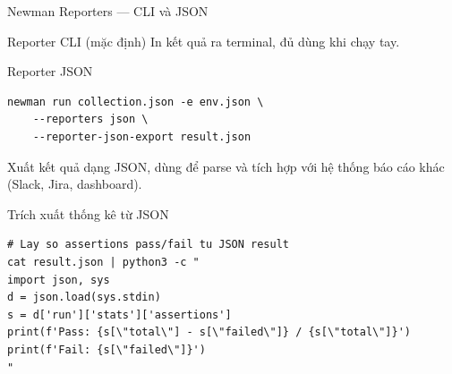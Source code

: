 \documentclass[aspectratio=169,10pt]{beamer}
\begin{document}
\begin{frame}[fragile]{Newman Reporters --- CLI và JSON}
  \begin{block}{Reporter CLI (mặc định)}
    In kết quả ra terminal, đủ dùng khi chạy tay.
  \end{block}

  \begin{block}{Reporter JSON}
\begin{lstlisting}[style=bash]
newman run collection.json -e env.json \
    --reporters json \
    --reporter-json-export result.json
\end{lstlisting}
    Xuất kết quả dạng JSON, dùng để parse và tích hợp
    với hệ thống báo cáo khác (Slack, Jira, dashboard).
  \end{block}

  \begin{block}{Trích xuất thống kê từ JSON}
\begin{lstlisting}[style=bash]
# Lay so assertions pass/fail tu JSON result
cat result.json | python3 -c "
import json, sys
d = json.load(sys.stdin)
s = d['run']['stats']['assertions']
print(f'Pass: {s[\"total\"] - s[\"failed\"]} / {s[\"total\"]}')
print(f'Fail: {s[\"failed\"]}')
"
\end{lstlisting}
  \end{block}
\end{frame}
\end{document}
